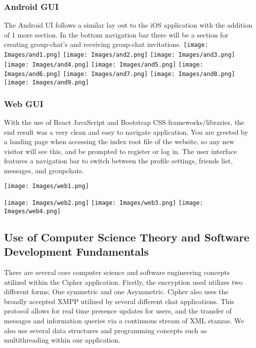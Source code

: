 \documentclass[12pt]{article}
\begin{document}
\subsubsection{Android GUI}
The Android UI follows a similar lay out to the iOS application with the addition of 1 more section. In the bottom navigation bar there will be a section for creating group-chat's and receiving group-chat invitations. \newline
\texttt{[image: Images/and1.png]}
\texttt{[image: Images/and2.png]}
\texttt{[image: Images/and3.png]}
\texttt{[image: Images/and4.png]}
\texttt{[image: Images/and5.png]}
\texttt{[image: Images/and6.png]}
\texttt{[image: Images/and7.png]}
\texttt{[image: Images/and8.png]}
\texttt{[image: Images/and9.png]}

\subsubsection{Web GUI}
With the use of React JavaScript and Bootstrap CSS frameworks/libraries, the end result was a very clean and easy to navigate application. You are greeted by a landing page when accessing the index root file of the website, so any new visitor will see this, and be prompted to register or log in. The user interface features a navigation bar to switch between the profile settings, friends list, messages, and groupchats. 

\texttt{[image: Images/web1.png]}


\texttt{[image: Images/web2.png]}
\texttt{[image: Images/web3.png]}
\texttt{[image: Images/web4.png]}




\subsection{Use of Computer Science Theory and Software Development Fundamentals}\label{chap:theory_sw} 
There are several core computer science and software engineering concepts utilized within the Cipher application. Firstly, the encryption used utilizes two different forms; One symmetric and one Asymmetric. Cipher also uses the broadly accepted XMPP utilized by several different chat applications. This protocol allows for real time presence updates for users, and the transfer of messages and information queries via a continuous stream of XML stanzas. We also use several data structures and programming concepts such as multithreading within our application. 
\end{document}
